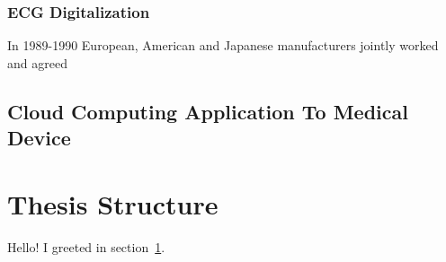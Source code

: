 \subsubsection{ECG Digitalization}
In 1989-1990 European, American and Japanese manufacturers jointly worked and agreed \cite{Chronaki}
\subsection{Cloud Computing Application To Medical Device}


\section{Thesis Structure}
\label{sec:greetings}

Hello!
I greeted in section~\ref{sec:greetings}.